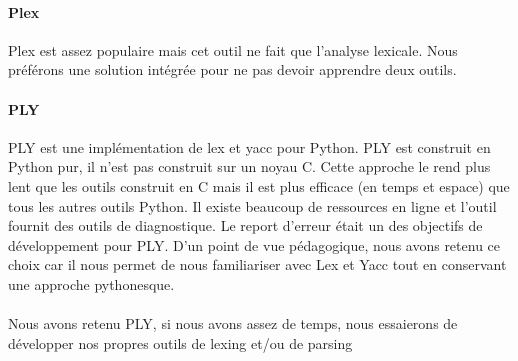 \documentclass[a4paper,11pt]{article}
\begin{document}
    \paragraph{Plex}
        Plex est assez populaire mais cet outil ne fait que l'analyse lexicale.
        Nous préférons une solution intégrée pour ne pas devoir apprendre deux outils.
        
    \paragraph{PLY}
        PLY est une implémentation de lex et yacc pour Python.
        PLY est construit en Python pur, il n'est pas construit sur un noyau C.
        Cette approche le rend plus lent que les outils construit en C mais il est plus efficace (en temps et espace)\cite{PLYtalk} que tous les autres outils Python.
        Il existe beaucoup de ressources en ligne et l'outil fournit des outils de diagnostique.
        Le report d'erreur était un des objectifs de développement pour PLY.        
        D'un point de vue pédagogique, nous avons retenu ce choix car il nous permet de nous familiariser avec Lex et Yacc tout en conservant une approche pythonesque.
        
    \paragraph{} Nous avons retenu PLY, si nous avons assez de temps, nous essaierons de développer nos propres outils de lexing et/ou de parsing
        


\end{document}
